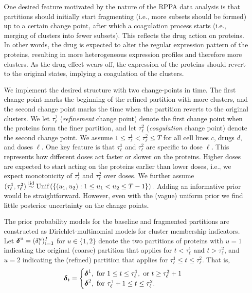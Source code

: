 One desired feature motivated by the nature of the RPPA data analysis
is that partitions should initially start fragmenting (i.e., more
subsets should be formed) up to a certain change point, after which a
coagulation process starts (i.e., merging of clusters into fewer
subsets). This reflects the drug action on proteins.  In other words,
the drug is expected to alter the regular expression pattern of the
proteins, resulting in more heterogeneous expression profiles and
therefore more clusters. As the drug effect wears off, the expression
of the proteins should revert to the original states, implying a
coagulation of the clusters.

We implement the desired structure with two change-points in time. The
first change point marks the beginning of the refined partition with more
clusters, and the second change point marks the time when the partition
reverts to the original clusters. We let $\tau^1_{\ell }$
(\textit{refinement} change point) denote the first change point when the
proteins form the finer partition, and let $\tau^2_{\ell }$
(\textit{coagulation} change point) denote the second change point.
We assume $1 \leq \tau^1_{\ell}
< \tau^2_{\ell } \leq T$ for all cell lines $c$, drugs $d$, and doses
$\ell$. One key feature is that $\tau^1_{\ell }$ and $\tau^2_{\ell}$ are
specific to dose $\ell$. This represents how different doses act
faster or slower on the proteins. Higher doses are expected to start
acting on the proteins earlier than lower doses, i.e., we expect
monotonicity of $\tau^1_{\ell}$ and $\tau^2_{\ell}$ over doses. We further
assume $
  (\tau^1_{\ell }, \tau^2_{\ell}) \stackrel{\mbox{\scriptsize iid}}{\sim} \mbox{Unif}\left(\{ (u_1, u_2): 1
\leq u_1 < u_2 \leq T-1\}\right).
$ Adding an informative prior would be straightforward. However, even
with the (vague) uniform prior we find little posterior uncertainty
on the change points.

The prior probability models for the baseline and fragmented partitions
are constructed as Dirichlet-multinomial models for cluster membership
indicators. Let $\mbox{\boldmath $\delta$}^u =(\delta^u_i)^I_{i=1}$ for $u\in \{1, 2\}$ denote the two partitions of
proteins with $u=1$ indicating the original (coarse) partition that applies for $t <
\tau^1_{\ell}$ and $t>\tau^2_{\ell}$, and $u=2$ indicating the (refined) partition
that applies for $\tau^1_{\ell} \leq t \leq \tau^2_{\ell}$. That is,
\begin{equation*}
\mbox{\boldmath $\delta$}_{t}=
\begin{cases}
  \mbox{\boldmath $\delta$}^1, \mbox{ for }
  1\leq t \leq \tau^1_{\ell }, \mbox{ or } t \geq \tau^2_{\ell }+1 \\
  \mbox{\boldmath $\delta$}^2, \mbox{ for } \tau^1_{\ell }+1 \leq t \leq \tau^2_{\ell }.
\end{cases}
\end{equation*}

